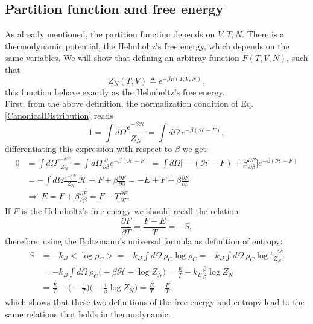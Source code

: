 \subsection{Partition function and free energy}
As already mentioned, the partition function depends on $V,T,N$. There is a thermodynamic potential, the Helmholtz's free energy, which depends on the same variables. We will show that defining an arbitray function $F(T,V,N)$, such that
\begin{equation*}
    Z_N(T,V)\triangleq e^{-\beta F(T,V,N)},
\end{equation*}
this function behave exactly as the Helmholtz's free energy.\\

First, from the above definition, the normalization condition of Eq. \eqref{CanonicalDistribution} reads
\begin{equation*}
    1=\int d\Omega \frac{e^{-\beta\mathcal{H} }}{Z_N}=\int d\Omega\ e^{-\beta(\mathcal{H}-F)}, 
\end{equation*}
differentiating this expression with respect to $\beta$ we get:
\begin{align*}
    0&=\int d\Omega \frac{e^{-\beta\mathcal{H} }}{Z_N}=\int d\Omega \frac{\partial}{\partial\beta}e^{-\beta(\mathcal{H}-F)}=\int d\Omega\bigg[-(\mathcal{H} -F)+\beta\frac{\partial F}{\partial\beta}\bigg] e^{-\beta(\mathcal{H}-F)}\\&=-\int d\Omega \frac{e^{-\beta\mathcal{H} }}{Z_N}\mathcal{H} +F+\beta\frac{\partial F}{\partial\beta}=-E+F+\beta\frac{\partial F}{\partial\beta}\\
    &\Rightarrow\ E=F+\beta\frac{\partial F}{\partial\beta}=F-T\frac{\partial F}{\partial T}.
\end{align*}
If $F$ is the Helmholtz's free energy we should recall the relation
\begin{equation*}
    \frac{\partial F}{\partial T}=\frac{F-E}{T}=-S,
\end{equation*}
therefore, using the Boltzmann's universal formula as definition of entropy:
\begin{align*}
    S&=-k_B\big<\log\rho_C\big>=-k_B\int d\Omega\ \rho_C\log\rho_C=-k_B\int d\Omega\ \rho_C\log\frac{e^{-\beta\mathcal{H}} }{Z_N}\\&=-k_B\int d\Omega\ \rho_C\big(-\beta\mathcal{H} -\log Z_N \big)=\frac{E}{T}+k_B\frac{\beta}{\beta}\log Z_N\\&=\frac{E}{T}+\bigg(-\frac{1}{T}\bigg)\bigg(-\frac{1}{\beta}\log Z_N\bigg)=\frac{E}{T}-\frac{F}{T},
\end{align*}
which shows that these two definitions of the free energy and entropy lead to the same relations that holds in thermodynamic.\\

